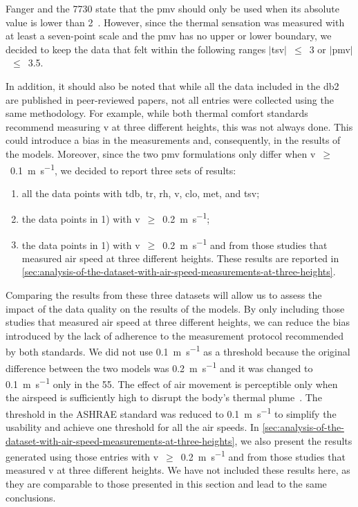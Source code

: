Fanger and the \gls{7730} state that the \ac{pmv} should only be used when its absolute value is lower than 2~\cite{Fanger1970, iso7730}.
However, since the thermal sensation was measured with at least a seven-point scale and the \ac{pmv} has no upper or lower boundary, we decided to keep the data that felt within the following ranges $|$\ac{tsv}$|$~$\leq$~\num{3} or $|$\ac{pmv}$|$~$\leq$~\num{3.5}.

In addition, it should also be noted that while all the data included in the \ac{db2} are published in peer-reviewed papers, not all entries were collected using the same methodology.
For example, while both thermal comfort standards recommend measuring \ac{v} at three different heights, this was not always done.
This could introduce a bias in the measurements and, consequently, in the results of the models.
Moreover, since the two \ac{pmv} formulations only differ when \ac{v}~$\geq$~\qty{0.1}{\m\per\s}, we decided to report three sets of results:
\begin{enumerate}[ {}1{)} ]
    \item all the data points with \ac{tdb}, \ac{tr}, \ac{rh}, \ac{v}, \ac{clo}, \ac{met}, and \ac{tsv};
    \item the data points in 1) with \ac{v}~$\geq$~\qty{0.2}{\m\per\s};
    \item the data points in 1) with \ac{v}~$\geq$~\qty{0.2}{\m\per\s} and from those studies that measured air speed at three different heights.
    These results are reported in \ref{sec:analysis-of-the-dataset-with-air-speed-measurements-at-three-heights}.
\end{enumerate}
Comparing the results from these three datasets will allow us to assess the impact of the data quality on the results of the models.
By only including those studies that measured air speed at three different heights, we can reduce the bias introduced by the lack of adherence to the measurement protocol recommended by both standards.
We did not use \qty{0.1}{\m\per\s} as a threshold because the original difference between the two models was \qty{0.2}{\m\per\s} and it was changed to \qty{0.1}{\m\per\s} only in the \gls{55}.
The effect of air movement is perceptible only when the airspeed is sufficiently high to disrupt the body's thermal plume~\cite{zukowska_impact_2012}.
The threshold in the ASHRAE standard was reduced to \qty{0.1}{\m\per\s} to simplify the usability and achieve one threshold for all the air speeds.
In \ref{sec:analysis-of-the-dataset-with-air-speed-measurements-at-three-heights}, we also present the results generated using those entries with \ac{v}~$\geq$~\qty{0.2}{\m\per\s} and from those studies that measured \ac{v} at three different heights.
We have not included these results here, as they are comparable to those presented in this section and lead to the same conclusions.

